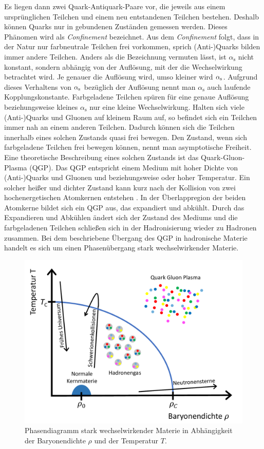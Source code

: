Es liegen dann zwei Quark-Antiquark-Paare vor, die jeweils aus einem ursprünglichen Teilchen und einem neu entstandenen Teilchen bestehen.
Deshalb können Quarks nur in gebundenen Zuständen gemessen werden.
Dieses Phänomen wird als \textit{Confinement} bezeichnet.
Aus dem \textit{Confinement} folgt, dass in der Natur nur farbneutrale Teilchen frei vorkommen, sprich (Anti-)Quarks bilden immer andere Teilchen.%
\newline
Anders als die Bezeichnung vermuten lässt, ist $\alpha_\text{s}$ nicht konstant, sondern abhängig von der Auf\-lö\-sung, mit der die Wechselwirkung betrachtet wird.
Je genauer die Auflösung wird, umso kleiner wird $\alpha_{\rm{s}}$.
Aufgrund dieses Verhaltens von $\alpha_{\rm{s}}$ bezüglich der Auflösung nennt man $\alpha_\text{s}$ auch laufende Kopplungskonstante.
Farbgeladene Teilchen spüren für eine genaue Auflösung beziehungsweise kleines $\alpha_\text{s}$ nur eine kleine Wechselwirkung.
\newline
Halten sich viele (Anti-)Quarks und Gluonen auf kleinem Raum auf, so befindet sich ein Teilchen immer nah an einem anderen Teilchen.
Dadurch können sich die Teilchen innerhalb eines solchen Zustands quasi frei bewegen.
Den Zustand, wenn sich farbgeladene Teilchen frei bewegen können, nennt man asymptotische Freiheit.
Eine theoretische Beschreibung eines solchen Zustands ist das  Quark-Gluon-Plasma (QGP).
Das QGP entspricht einem Medium mit hoher Dichte von (Anti-)Quarks und Gluonen und be\-zie\-hungs\-wei\-se oder hoher Temperatur.
\newline
Ein solcher heißer und dichter Zustand kann kurz nach der Kollision von zwei hochenergetischen Atomkernen entstehen \cite{Karsch:2006xs}.
In der Überlappregion der beiden Atomkerne bildet sich ein QGP aus, das expandiert und abkühlt.
Durch das Expandieren und Abkühlen ändert sich der Zustand des Mediums und die farbgeladenen Teilchen schließen sich in der  Hadronisierung wieder zu Hadronen zusammen.
Bei dem beschriebene Übergang des QGP in hadronische Materie handelt es sich um einen Phasenübergang stark wechselwirkender Materie.
\begin{figure}[tp]
\centering
\includegraphics[width=.6\linewidth]{QCD_phase_diagram.pdf}
\caption{Phasendiagramm stark wechselwirkender Materie in Abhängigkeit der Baryonendichte $\rho$ und der Temperatur $T$.
\cite{Thesis:Tim}}
\label{fig:QGPPhase}
\end{figure}
